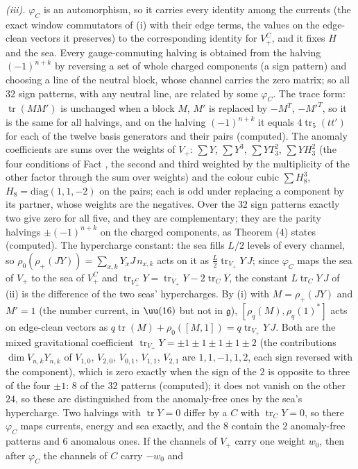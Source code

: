 \emph{(iii).} $\varphi_{C}$ is an automorphism, so it carries every identity among the currents (the exact window commutators of (i) with their edge terms, the values on the edge-clean vectors it preserves) to the corresponding identity for $V_{+}^{C}$, and it fixes $H$ and the sea. Every gauge-commuting halving is obtained from the halving $(-1)^{n+k}$ by reversing a set of whole charged components (a sign pattern) and choosing a line of the neutral block, whose channel carries the zero matrix; so all $32$ sign patterns, with any neutral line, are related by some $\varphi_{C}$. The trace form: $\operatorname{tr}(MM')$ is unchanged when a block $M$, $M'$ is replaced by $-M^{T}$, $-M'^{T}$, so it is the same for all halvings, and on the halving $(-1)^{n+k}$ it equals $4\operatorname{tr}_{5}(tt')$ for each of the twelve basis generators and their pairs (computed). The anomaly coefficients are sums over the weights of $V_{+}$: $\sum Y$, $\sum Y^{3}$, $\sum YT_{3}^{2}$, $\sum YH_{3}^{2}$ (the four conditions of Fact , the second and third weighted by the multiplicity of the other factor through the sum over weights) and the colour cubic $\sum H_{8}^{3}$, $H_{8} = \mathrm{diag}(1, 1, -2)$ on the pairs; each is odd under replacing a component by its partner, whose weights are the negatives. Over the $32$ sign patterns exactly two give zero for all five, and they are complementary; they are the parity halvings $\pm(-1)^{n+k}$ on the charged components, as Theorem (4) states (computed). The hypercharge constant: the sea fills $L/2$ levels of every channel, so $\rho_{0}(\rho_{+}(JY)) = \sum_{x,k}Y_{x}J\,n_{x,k}$ acts on it as $\tfrac{L}{2}\operatorname{tr}_{V_{+}}Y\,J$; since $\varphi_{C}$ maps the sea of $V_{+}$ to the sea of $V_{+}^{C}$ and $\operatorname{tr}_{V_{+}^{C}}Y = \operatorname{tr}_{V_{+}}Y - 2\operatorname{tr}_{C}Y$, the constant $L\operatorname{tr}_{C}Y\,J$ of (ii) is the difference of the two seas' hypercharges. By (i) with $M = \rho_{+}(JY)$ and $M' = 1$ (the number current, in $\uu(16)$ but not in $\mathfrak{g}$), $[\rho_{q}(M), \rho_{q}(1)^{*}]$ acts on edge-clean vectors as $q\operatorname{tr}(M) + \rho_{0}([M, 1]) = q\operatorname{tr}_{V_{+}}Y\,J$. Both are the mixed gravitational coefficient $\operatorname{tr}_{V_{+}}Y = \pm 1 \pm 1 \pm 1 \pm 1 \pm 2$ (the contributions $\dim V_{n,k}Y_{n,k}$ of $V_{1,0}$, $V_{2,0}$, $V_{0,1}$, $V_{1,1}$, $V_{2,1}$ are $1, 1, -1, 1, 2$, each sign reversed with the component), which is zero exactly when the sign of the $2$ is opposite to three of the four $\pm1$: $8$ of the $32$ patterns (computed); it does not vanish on the other $24$, so these are distinguished from the anomaly-free ones by the sea's hypercharge. Two halvings with $\operatorname{tr}Y = 0$ differ by a $C$ with $\operatorname{tr}_{C}Y = 0$, so there $\varphi_{C}$ maps currents, energy and sea exactly, and the $8$ contain the $2$ anomaly-free patterns and $6$ anomalous ones. If the channels of $V_{+}$ carry one weight $w_{0}$, then after $\varphi_{C}$ the channels of $C$ carry $-w_{0}$ and 